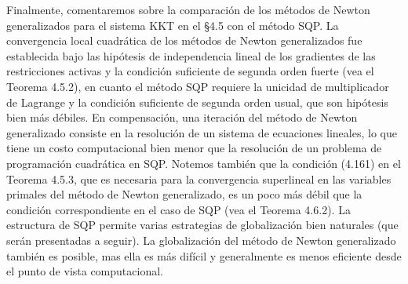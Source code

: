 Finalmente, comentaremos sobre la comparación de los métodos de Newton generalizados para el sistema KKT en el \S 4.5 con el método SQP. La convergencia local cuadrática de los métodos de Newton generalizados fue establecida bajo las hipótesis de independencia lineal de los gradientes de las restricciones activas y la condición suficiente de segunda orden fuerte (vea el Teorema 4.5.2), en cuanto el método SQP requiere la unicidad de multiplicador de Lagrange y la condición suficiente de segunda orden usual, que son hipótesis bien más débiles. En compensación, una iteración del método de Newton generalizado consiste en la resolución de un sistema de ecuaciones lineales, lo que tiene un costo computacional bien menor que la resolución de un problema de programación cuadrática en SQP. Notemos también que la condición (4.161) en el Teorema 4.5.3, que es necesaria para la convergencia superlineal en las variables primales del método de Newton generalizado, es un poco más débil que la condición correspondiente en el caso de SQP (vea el Teorema 4.6.2). La estructura de SQP permite varias estrategias de globalización bien naturales (que serán presentadas a seguir). La globalización del método de Newton generalizado también es posible, mas ella es más difícil y generalmente es menos eficiente desde el punto de vista computacional.
